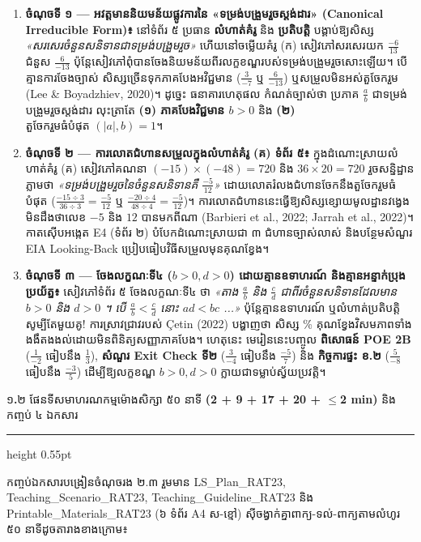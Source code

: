 \documentclass[a4paper,12pt]{article}
\newcommand{\en}[1]{{\TimesEn #1}}
\newcommand{\enbf}[1]{{\TimesEn\textbf{#1}}}
\newcommand{\cnum}[1]{{\TimesEn\fontsize{10.5pt}{12pt}\selectfont\ding{\numexpr181+#1\relax}}}
\newcommand{\subsectitle}[1]{{\muol\fontsize{11.5pt}{16pt}\selectfont #1}}
\newcommand{\subsec}[1]{%
  \Needspace{1.8cm}%
  \vspace{2pt}%
  \subsectitle{#1}\par%
  \vspace{-2pt}%
  {\color{black}\hrule height 0.55pt}%
  \vspace{2pt}%
}
\begin{document}
\begin{enumerate}[leftmargin=0.65cm]
  \item \textbf{ចំណុចទី ១ \en{---} អវត្តមាននិយមន័យផ្លូវការនៃ «ទម្រង់បង្រួមរួចស្ដង់ដារ» (\en{Canonical Irreducible Form})៖} នៅទំព័រ ៥ ប្រធាន \textbf{លំហាត់គំរូ} និង \textbf{ប្រតិបត្តិ} បង្គាប់ឱ្យសិស្ស \textit{«សរសេរចំនួនសនិទានជាទម្រង់បង្រួមរួច»} ហើយនៅចម្លើយគំរូ (ក) សៀវភៅសរសេរយក $\frac{-6}{13}$ ជំនួស $\frac{6}{-13}$ ប៉ុន្តែសៀវភៅពុំបានចែងនិយមន័យពីរលក្ខខណ្ឌរបស់ទម្រង់បង្រួមរួចសោះឡើយ។ បើគ្មានការចែងច្បាស់ សិស្សច្រើនទុកភាគបែងអវិជ្ជមាន ($\frac{3}{-7}$ ឬ $\frac{6}{-13}$) ឬសម្រួលមិនអស់តួចែករួម \en{(Lee \& Boyadzhiev, 2020)}។ ដូច្នេះ ធនាគារហេតុផល \cnum{5} កំណត់ច្បាស់ថា ប្រភាគ $\frac{a}{b}$ ជាទម្រង់បង្រួមរួចស្ដង់ដារ លុះត្រាតែ \textbf{(១) ភាគបែងវិជ្ជមាន $b>0$} និង \textbf{(២) $\text{តួចែករួមធំបំផុត }(|a|,b)=1$}។
  \item \textbf{ចំណុចទី ២ \en{---} ការលោតជំហានសម្រួលក្នុងលំហាត់គំរូ (គ) ទំព័រ ៥៖} ក្នុងដំណោះស្រាយលំហាត់គំរូ (គ) សៀវភៅគណនា $(-15)\times(-48)=720$ និង $36\times 20=720$ រួចសន្និដ្ឋានភ្លាមថា \textit{«ទម្រង់បង្រួមរួចនៃចំនួនសនិទានគឺ $\frac{-5}{12}$»} ដោយលោតរំលងជំហានចែកនឹងតួចែករួមធំបំផុត ($\frac{-15\div 3}{36\div 3}=\frac{-5}{12}$ ឬ $\frac{-20\div 4}{48\div 4}=\frac{-5}{12}$)។ ការលោតជំហាននេះធ្វើឱ្យសិស្សខ្សោយមូលដ្ឋានវង្វេងមិនដឹងថាលេខ $-5$ និង $12$ បានមកពីណា \en{(Barbieri et al., 2022; Jarrah et al., 2022)}។ កាតស៊ើបអង្កេត \en{E4} (ទំព័រ ២) បំបែកដំណោះស្រាយជា ៣ ជំហានច្បាស់លាស់ និងបន្ថែមសំណួរ \en{EIA Looking-Back} ប្រៀបធៀបវិធីសម្រួលមុនគុណខ្វែង។
  \item \textbf{ចំណុចទី ៣ \en{---} ចែងលក្ខណៈទី៤ ($b>0, d>0$) ដោយគ្មានឧទាហរណ៍ និងគ្មានអន្ទាក់ប្រុងប្រយ័ត្ន៖} សៀវភៅទំព័រ ៥ ចែងលក្ខណៈទី៤ ថា \textit{«តាង $\frac{a}{b}$ និង $\frac{c}{d}$ ជាពីរចំនួនសនិទានដែលមាន $b>0$ និង $d>0$ ។ បើ $\frac{a}{b}<\frac{c}{d}$ នោះ $ad<bc$ ...»} ប៉ុន្តែគ្មានឧទាហរណ៍ ឬលំហាត់ប្រតិបត្តិសូម្បីតែមួយគូ! ការស្រាវជ្រាវរបស់ \en{Çetin (2022)} បង្ហាញថា សិស្ស \en{25\%} គុណខ្វែងវិសមភាពទាំងងងឹតងងល់ដោយមិនពិនិត្យសញ្ញាភាគបែង។ ហេតុនេះ មេរៀននេះបញ្ចូល \textbf{ពិសោធន៍ \en{POE 2B}} ($\frac{1}{-2}$ ធៀបនឹង $\frac{1}{3}$), \textbf{សំណួរ \en{Exit Check} ទី២} ($\frac{3}{-4}$ ធៀបនឹង $\frac{-5}{7}$) និង \textbf{កិច្ចការផ្ទះ ខ.២} ($\frac{5}{-8}$ ធៀបនឹង $\frac{-3}{5}$) ដើម្បីឱ្យលក្ខខណ្ឌ $b>0, d>0$ ក្លាយជាទម្លាប់ស្វ័យប្រវត្តិ។
\end{enumerate}

\subsec{១\enbf{.}២ ផែនទីសមាហរណកម្មម៉ោងសិក្សា ៥០ នាទី \enbf{(2 + 9 + 17 + 20 + $\le$2 min)} និងកញ្ចប់ ៤ ឯកសារ}

កញ្ចប់ឯកសារបង្រៀនចំណុចរង ២.៣ រួមមាន \en{LS\_\allowbreak Plan\_\allowbreak RAT23}, \en{Teaching\_\allowbreak Scenario\_\allowbreak RAT23}, \en{Teaching\_\allowbreak Guideline\_\allowbreak RAT23} និង \en{Printable\_\allowbreak Materials\_\allowbreak RAT23} (៦ ទំព័រ \en{A4} ស-ខ្មៅ) ស៊ីចង្វាក់គ្នាពាក្យ-ទល់-ពាក្យតាមលំហូរ ៥០ នាទីដូចតារាងខាងក្រោម៖
\end{document}
